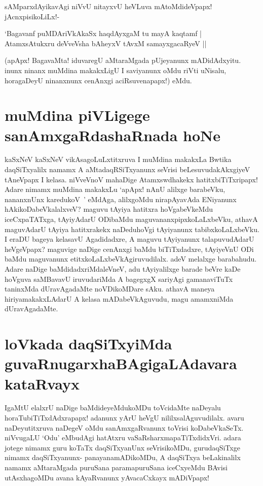 sAMparxdAyikavAgi niVvU nitayxvU heVLuva mAtoMdideVpapx! jAcnxpisikoLiLx!-

\begin{shloka}
`Bagavanf puMDAriVkAkaSx haqdAyxgaM tu mayA kaqtamf |\label{115a}\\
AtamxsAtukxru deVveVsha bAheyxV tAvxM samayxgacaRyeV ||
\end{shloka}

(apApx! BagavaMta! iduvaregU aMtaraMgada pUjeyanunx mADidAdxyitu. inunx ninanx muMdina makakxLigU I saviyanunx oMdu riVti uNisalu, horagaDeyU ninanxnunx cenAnxgi aciRsuvenapapx!) eMdu.

\section*{muMdina piVLigege sanAmxgaRdashaRnada hoNe}

kaSxNeV kaSxNeV vikAsagoLuLxtitxruva I muMdina makakxLa Bwtika daqSiTxyalilx namamx A aMtadaqRSiTxyanunx seVrisi beLesuvudakAkxgiyeV tAneVpapx I kelasa. niVveVnoV mahaDige Atamxswdhakekx hatitxbiTiTxripapx! Adare nimamx muMdina makakxLu `apApx! nAnU alilxge barabeVku, nananxnUnx karedukoV~' eMdAga, alilxgoMdu nirapAyavAda ENiyanunx hAkikoDabeVkalalxveV? maguvu tAyiya hatitxra hoVgabeVkeMdu iceCxpaTATxga, tAyiyAdarU ODibaMdu maguvananxpipxkoLaLxbeVku, athavA maguvAdarU tAyiya hatitxrakekx naDeduhoVgi tAyiyanunx tabibxkoLaLxbeVku. I eraDU bageya kelasavU Agadidadxre, A maguvu tAyiyanunx talapuvudAdarU heVgeVpapx? maguvige naDige cenAnxgi baMdu biTiTxdadxre, tAyiyeVnU ODi baMdu maguvanunx etitxkoLaLxbeVkAgiruvudilalx. adeV melalxge barabahudu. Adare naDige baMdidadxriMdaleVneV, adu tAyiyalilxge barade beVre kaDe hoVguva saMBavavU iruvudariMda A bagegxgX sariyAgi gamanaviTuTx taninxMda dUravAgadaMte noVDikoMDare sAku. athavA maneya hiriyamakakxLAdarU A kelasa mADabeVkAguvudu, magu amamxniMda dUravAgadaMte.

\section*{loVkada daqSiTxyiMda guvaRnugarxhaBAgigaLAdavara kataRvayx}

IgaMtU elalxrU naDige baMdideyeMdukoMDu toVcidaMte naDeyalu horaTubiTiTxdAdxrapapx! adanunx yArU heVgU nililxsalAguvudilalx. avaru naDeyutitxruva naDegeV oMdu sanAmxgaRvanunx toVrisi koDabeVkaSeTx. niVvugaLU `Odu' eMbudAgi hatAtxru vaSaRsharxmapaTiTxdidxVri. adara jotege nimamx guru koTaTx daqSiTxyanUnx seVrisikoMDu, gurudaqSiTxge nimamx daqSiTxyanunx- panayanamADikoMDu, A daqSiTxya beLakinalilx namamx aMtaraMgada puruSana paramapuruSana iceCxyeMdu BAvisi utAsxhagoMDu avana kAyaRvanunx yAvacaCxkayx mADiVpapx!

